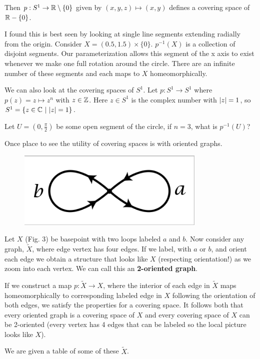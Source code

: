 \documentclass[10pt]{article}
\begin{document}
Then $p: S^1 \to \mathbb{R} \setminus \{0\}$ given by $(x, y, z) \mapsto (x, y)$ defines a
covering space of $\mathbb{R} - \{ 0 \}$.

I found this is best seen by looking at single line segments extending radially
from the origin. Consider $X = (0.5, 1.5) \times \{0\}$. $p^{-1}(X)$ is a
collection of disjoint segments. Our parameterization allows this segment of
the x axis to exist whenever we make one full rotation around the circle. There
are an infinite number of these segments and each maps to $X$ homeomorphically.

We can also look at the covering spaces of $S^1$. Let $p: S^1 \to S^1$ where
$p(z) = z \mapsto z^n$ with $z \in \mathbb{Z}$. Here $z \in S^1$ is the complex number
with $\lvert z\rvert = 1$, so $S^1 = \{ z \in \mathbb{C} ~|~ \lvert z\rvert = 1\}$.

Let $U = (0, \frac{\pi}{2})$ be some open segment of the circle, if $n=3$, what is
$p^{-1}(U)$?

Once place to see the utility of covering spaces is with oriented graphs.

\begin{figure}[ht!]
\centering
\includegraphics[width=90mm]{./2-oriented.png}
\caption{}
\end{figure}


Let $X$ (Fig. 3) be basepoint with two loops labeled $a$ and $b$. Now consider any
graph, $\tilde{X}$, where edge vertex has four edges. If we label, with $a$ or
$b$, and orient each edge we obtain a structure that looks like $X$ (respecting
orientation!) as we zoom into each vertex. We can call this an \textbf{2-oriented graph}.

If we construct a map $p: \tilde{X} \to X$, where the interior of each edge in 
$\tilde{X}$ maps homeomorphically to corresponding labeled edge in $X$
following the orientation of both edges, we satisfy the properties for a covering
space. It follows both that every oriented graph is a covering space of $X$ and
every covering space of $X$ can be 2-oriented (every vertex has 4 edges that
can be labeled so the local picture looks like $X$).

We are given a table of some of these $\tilde{X}$.
\end{document}

